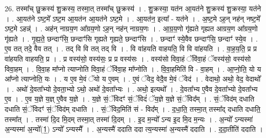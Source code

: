 \documentclass[17pt]{extarticle}
\begin{document}
26. तस्मा᳚च् छु॒क्रस्य॑ शु॒क्रस्य॒ तस्मा॒त् तस्मा᳚च् छु॒क्रस्य॑ । . शु॒क्रस्या॒ यत॑न आ॒यत॑ने शु॒क्रस्य॑ शु॒क्रस्या॒ यत॑ने । . आ॒यत॑ने ऽष्ट॒मे᳚ ऽष्ट॒म आ॒यत॑न आ॒यत॑ने ऽष्ट॒मे । . आ॒यत॑न॒ इत्या᳚ - यत॑ने । . अ॒ष्ट॒मे ऽह॒न् नह॑न् नष्ट॒मे᳚ ऽष्ट॒मे ऽहन्न्॑ । . अह॑न् नाग्रय॒ण आ᳚ग्रय॒णो ऽह॒न् नह॑न् नाग्रय॒णः । . आ॒ग्र॒य॒णो गृ॑ह्यते गृह्यत आग्रय॒ण आ᳚ग्रय॒णो गृ॑ह्यते । . गृ॒ह्य॒ते॒ छन्दाꣳ॑सि॒ छन्दाꣳ॑सि गृह्यते गृह्यते॒ छन्दाꣳ॑सि । . छन्दाꣳ॑ स्ये॒वैव छन्दाꣳ॑सि॒ छन्दाꣳ॑ स्ये॒व । . ए॒व तत् तदे॒ वैव तत् । . तद् वि वि तत् तद् वि । . वि वा॑हयति वाहयति॒ वि वि वा॑हयति । . वा॒ह॒य॒ति॒ प्र प्र वा॑हयति वाहयति॒ प्र । . प्र वस्य॑सो॒ वस्य॑सः॒ प्र प्र वस्य॑सः । . वस्य॑सो विवा॒हं ॅवि॑वा॒हं ॅवस्य॑सो॒ वस्य॑सो विवा॒हम् । . वि॒वा॒ह मा᳚प्नो त्याप्नोति विवा॒हं ॅवि॑वा॒ह मा᳚प्नोति । . वि॒वा॒हमिति॑ वि - वा॒हम् । . आ॒प्नो॒ति॒ यो य आ᳚प्नो त्याप्नोति॒ यः । . य ए॒व मे॒वं ॅयो य ए॒वम् । . ए॒वं ॅवेद॒ वेदै॒व मे॒वं ॅवेद॑ । . वेदाथो॒ अथो॒ वेद॒ वेदाथो᳚ । . अथो॑ दे॒वता᳚भ्यो दे॒वता॒भ्यो ऽथो॒ अथो॑ दे॒वता᳚भ्यः । . अथो॒ इत्यथो᳚ । . दे॒वता᳚भ्य ए॒वैव दे॒वता᳚भ्यो दे॒वता᳚भ्य ए॒व । . ए॒व य॒ज्ञे य॒ज्ञ् ए॒वैव य॒ज्ञे । . य॒ज्ञे सं॒ॅविदꣳ॑ सं॒ॅविदं॑ ॅय॒ज्ञे य॒ज्ञे सं॒ॅविद᳚म् । . सं॒ॅविद॑म् दधाति दधाति सं॒ॅविदꣳ॑ सं॒ॅविद॑म् दधाति । . सं॒ॅविद॒मिति॑ सं - विद᳚म् । . द॒धा॒ति॒ तस्मा॒त् तस्मा᳚द् दधाति दधाति॒ तस्मा᳚त् । . तस्मा॑ दि॒द मि॒दम् तस्मा॒त् तस्मा॑ दि॒दम् । . इ॒द म॒न्यो᳚ ऽन्य इ॒द मि॒द म॒न्यः । . अ॒न्यो᳚ ऽन्यस्मा॑ अ॒न्यस्मा॑ अ॒न्यो᳚(1॒) ऽन्यो᳚ ऽन्यस्मै᳚ । . अ॒न्यस्मै॑ ददाति ददा त्य॒न्यस्मा॑ अ॒न्यस्मै॑ ददाति । . द॒दा॒तीति॑ ददाति । \newline
\end{document}
